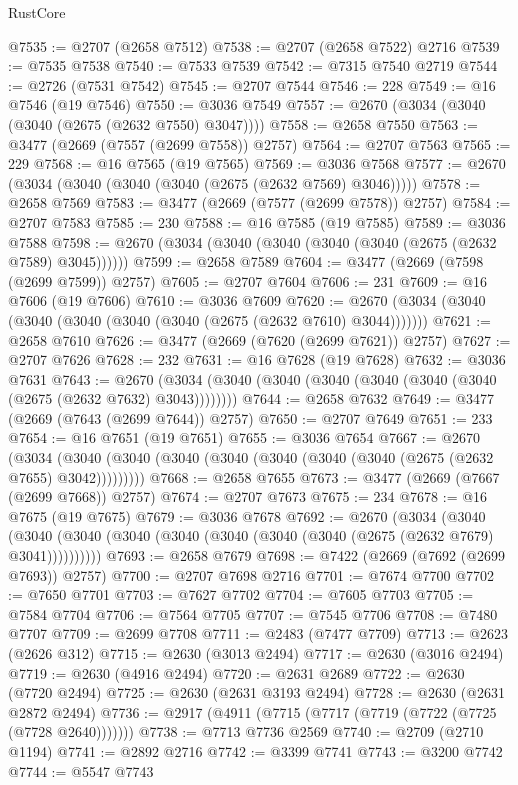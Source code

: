 \begin{lexlean}{RustCore}
\begin{coremodule}
@7535 := @2707 (@2658 @7512)
@7538 := @2707 (@2658 @7522) @2716
@7539 := @7535 @7538
@7540 := @7533 @7539
@7542 := @7315 @7540 @2719
@7544 := @2726 (@7531 @7542)
@7545 := @2707 @7544
@7546 := 228
@7549 := @16 @7546 (@19 @7546)
@7550 := @3036 @7549
@7557 := @2670 (@3034 (@3040 (@3040 (@2675 (@2632 @7550) @3047))))
@7558 := @2658 @7550
@7563 := @3477 (@2669 (@7557 (@2699 @7558)) @2757)
@7564 := @2707 @7563
@7565 := 229
@7568 := @16 @7565 (@19 @7565)
@7569 := @3036 @7568
@7577 := @2670 (@3034 (@3040 (@3040 (@3040 (@2675 (@2632 @7569) @3046)))))
@7578 := @2658 @7569
@7583 := @3477 (@2669 (@7577 (@2699 @7578)) @2757)
@7584 := @2707 @7583
@7585 := 230
@7588 := @16 @7585 (@19 @7585)
@7589 := @3036 @7588
@7598 := @2670 (@3034 (@3040 (@3040 (@3040 (@3040 (@2675 (@2632 @7589) @3045))))))
@7599 := @2658 @7589
@7604 := @3477 (@2669 (@7598 (@2699 @7599)) @2757)
@7605 := @2707 @7604
@7606 := 231
@7609 := @16 @7606 (@19 @7606)
@7610 := @3036 @7609
@7620 := @2670 (@3034 (@3040 (@3040 (@3040 (@3040 (@3040 (@2675 (@2632 @7610) @3044)))))))
@7621 := @2658 @7610
@7626 := @3477 (@2669 (@7620 (@2699 @7621)) @2757)
@7627 := @2707 @7626
@7628 := 232
@7631 := @16 @7628 (@19 @7628)
@7632 := @3036 @7631
@7643 := @2670 (@3034 (@3040 (@3040 (@3040 (@3040 (@3040 (@3040 (@2675 (@2632 @7632) @3043))))))))
@7644 := @2658 @7632
@7649 := @3477 (@2669 (@7643 (@2699 @7644)) @2757)
@7650 := @2707 @7649
@7651 := 233
@7654 := @16 @7651 (@19 @7651)
@7655 := @3036 @7654
@7667 := @2670
    (@3034 (@3040 (@3040 (@3040 (@3040 (@3040 (@3040 (@3040 (@2675 (@2632 @7655) @3042)))))))))
@7668 := @2658 @7655
@7673 := @3477 (@2669 (@7667 (@2699 @7668)) @2757)
@7674 := @2707 @7673
@7675 := 234
@7678 := @16 @7675 (@19 @7675)
@7679 := @3036 @7678
@7692 := @2670
    (@3034
      (@3040 (@3040 (@3040 (@3040 (@3040 (@3040 (@3040 (@3040 (@2675 (@2632 @7679) @3041))))))))))
@7693 := @2658 @7679
@7698 := @7422 (@2669 (@7692 (@2699 @7693)) @2757)
@7700 := @2707 @7698 @2716
@7701 := @7674 @7700
@7702 := @7650 @7701
@7703 := @7627 @7702
@7704 := @7605 @7703
@7705 := @7584 @7704
@7706 := @7564 @7705
@7707 := @7545 @7706
@7708 := @7480 @7707
@7709 := @2699 @7708
@7711 := @2483 (@7477 @7709)
@7713 := @2623 (@2626 @312)
@7715 := @2630 (@3013 @2494)
@7717 := @2630 (@3016 @2494)
@7719 := @2630 (@4916 @2494)
@7720 := @2631 @2689
@7722 := @2630 (@7720 @2494)
@7725 := @2630 (@2631 @3193 @2494)
@7728 := @2630 (@2631 @2872 @2494)
@7736 := @2917 (@4911 (@7715 (@7717 (@7719 (@7722 (@7725 (@7728 @2640)))))))
@7738 := @7713 @7736 @2569
@7740 := @2709 (@2710 @1194)
@7741 := @2892 @2716
@7742 := @3399 @7741
@7743 := @3200 @7742
@7744 := @5547 @7743

\end{coremodule}
\end{lexlean}
